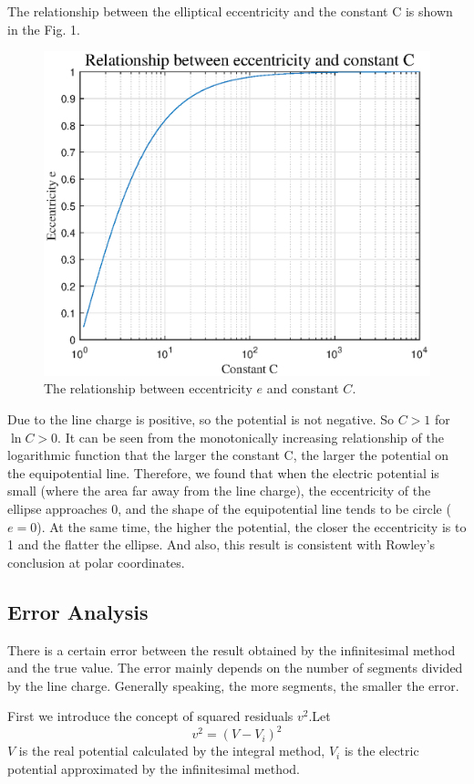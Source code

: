 \documentclass[journal,twocolumn,letterpaper]{IEEEJERM}
\begin{document}
The relationship between the elliptical eccentricity and the constant C is shown in the Fig. 1. 
\begin{figure}[H]   
	\centering	        \includegraphics[width=0.9\linewidth]{Fig7.eps}
	\caption{The relationship between eccentricity $e$ and constant $C$.}	  
	\label{fig7} 
\end{figure}
Due to the line charge is positive, so the potential is not negative. So $C>1$ for $\ln{C}>0$. It can be seen from the monotonically increasing relationship of the logarithmic function that the larger the constant C, the larger the potential on the equipotential line. Therefore, we found that when the electric potential is small (where the area far away from the line charge), the eccentricity of the ellipse approaches 0, and the shape of the equipotential line tends to be circle ($e=0$). At the same time, the higher the potential, the closer the eccentricity is to 1 and the flatter the ellipse. And also, this result is consistent with Rowley's conclusion at polar coordinates.\cite{num3} 


\subsection{Error Analysis}
There is a certain error between the result obtained by the infinitesimal method and the true value. The error mainly depends on the number of segments divided by the line charge. Generally speaking, the more segments, the smaller the error.

First we introduce the concept of squared residuals $v^2$.Let $$v^2=(V-V_i)^2$$ $V$ is the real potential calculated by the integral method, $V_i$ is the electric potential approximated by the infinitesimal method.
\end{document}
